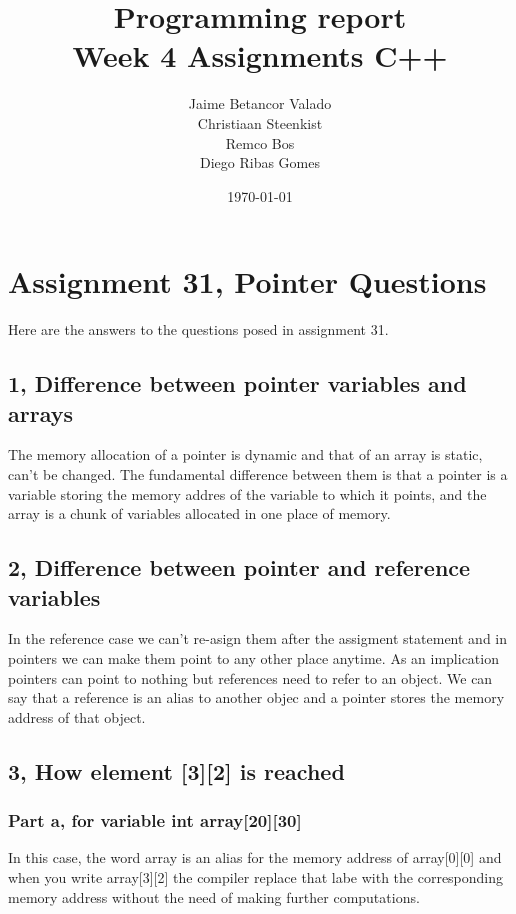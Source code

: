 \documentclass[11pt]{article}
\begin{document}
\title{Programming report \\
       Week 4 Assignments C++
}
\date{\today}
\author{Jaime Betancor Valado \\
Christiaan Steenkist \\
Remco Bos \\
Diego Ribas Gomes
}

\maketitle

\section*{Assignment 31, Pointer Questions}
Here are the answers to the questions posed in assignment 31.

\subsection*{1, Difference between pointer variables and arrays}
The memory allocation of a pointer is dynamic and that of an array is static, can't be changed.
The fundamental difference between them is that a pointer is a variable storing the memory addres of the variable to which it points, and the array is a chunk of variables allocated in one place of memory.

\subsection*{2, Difference between pointer and reference variables}
In the reference case we can't re-asign them after the assigment statement and in pointers we can make them point to any other place anytime.
As an implication pointers can point to nothing but references need to refer to an object.
We can say that a reference is an alias to another objec and a pointer stores the memory address of that object.

\subsection*{3, How element [3][2] is reached}

\subsubsection*{Part a, for variable int array[20][30]}
In this case, the word array is an alias for the memory address of array[0][0] and when you write array[3][2] the compiler replace that labe with the corresponding memory address without the need of making further computations.
\end{document}
